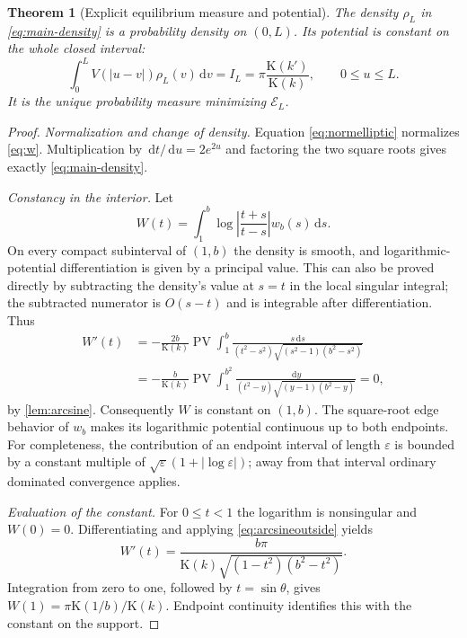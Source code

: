 \documentclass[11pt,a4paper]{article}
\newtheorem{theorem}{Theorem}[section]
\theoremstyle{definition}
\theoremstyle{remark}
\newcommand{\dd}{\,\mathrm d}
\newcommand{\PV}{\operatorname{PV}}
\newcommand{\E}{\mathcal E}
\newcommand{\K}{\mathrm K}
\begin{document}
\begin{theorem}[Explicit equilibrium measure and potential]
\label{thm:equilibrium}
The density $\rho_L$ in \eqref{eq:main-density} is a probability density on
$(0,L)$. Its potential is constant on the whole closed interval:
\begin{equation}
 \int_0^L V(|u-v|)\rho_L(v)\dd v
 =I_L=\pi\frac{\K(k')}{\K(k)},\qquad 0\le u\le L.
 \label{eq:constantpotential}
\end{equation}
It is the unique probability measure minimizing $\E_L$.
\end{theorem}
\begin{proof}
\emph{Normalization and change of density.}
Equation \eqref{eq:normelliptic} normalizes \eqref{eq:w}. Multiplication by
$\dd t/\dd u=2e^{2u}$ and factoring the two square roots gives exactly
\eqref{eq:main-density}.

\emph{Constancy in the interior.}
Let
\[
 W(t)=\int_1^b\log\left|\frac{t+s}{t-s}\right|w_b(s)\dd s.
\]
On every compact subinterval of $(1,b)$ the density is smooth, and
logarithmic-potential differentiation is given by a principal value.
This can also be proved directly by subtracting the density's value at
$s=t$ in the local singular integral; the subtracted numerator is
$O(s-t)$ and is integrable after differentiation. Thus
\begin{align*}
 W'(t)
 &=-\frac{2b}{\K(k)}\PV\int_1^b
 \frac{s\dd s}{(t^2-s^2)\sqrt{(s^2-1)(b^2-s^2)}}\\
 &=-\frac b{\K(k)}\PV\int_1^{b^2}
 \frac{\dd y}{(t^2-y)\sqrt{(y-1)(b^2-y)}}=0,
\end{align*}
by \cref{lem:arcsine}. Consequently $W$ is constant on $(1,b)$.
The square-root edge behavior of $w_b$ makes its logarithmic potential
continuous up to both endpoints. For completeness, the contribution of
an endpoint interval of length $\varepsilon$ is bounded by a constant
multiple of $\sqrt\varepsilon(1+|\log\varepsilon|)$; away from that interval
ordinary dominated convergence applies.

\emph{Evaluation of the constant.}
For $0\le t<1$ the logarithm is nonsingular and $W(0)=0$. Differentiating
and applying \eqref{eq:arcsineoutside} yields
\[
 W'(t)=\frac{b\pi}{\K(k)\sqrt{(1-t^2)(b^2-t^2)}}.
\]
Integration from zero to one, followed by $t=\sin\theta$, gives
$W(1)=\pi\K(1/b)/\K(k)$. Endpoint continuity identifies this with the
constant on the support.


\end{proof}
\end{document}
